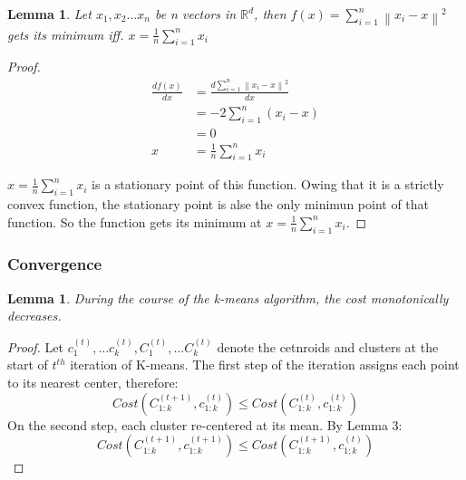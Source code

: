 \documentclass[11pt]{article}
\newtheorem{lemma}[theorem]{Lemma}
\begin{document}
\begin{lemma}
  Let $x_1, x_2 \dots x_n$ be n vectors in $\mathbb{R}^{d}$, then $f(x) = \sum_{i=1}^{n} {\left\lVert x_i - x\right\rVert}^2 $ gets its minimum iff. $x = \frac{1}{n} \sum_{i=1}^{n}x_i$
\end{lemma}
\begin{proof}
  \begin{equation*}
    \begin{split}
      \frac{d f(x)}{d x} &=  \frac{d \sum_{i=1}^{n} {\left\lVert x_i - x\right\rVert}^2}{d x} \\
      & = -2\sum_{i=1}^{n} (x_i - x) \\
      & = 0 \\
      x & = \frac{1}{n} \sum_{i=1}^{n}x_i
    \end{split}
  \end{equation*}
  
  \par $x = \frac{1}{n} \sum_{i=1}^{n}x_i$ is a stationary point of this function. Owing that it is a strictly convex function, the stationary point is alse the only minimun point of that function. 
  So the function gets its minimum at $x = \frac{1}{n} \sum_{i=1}^{n}x_i$.
  \end{proof}
  \subsubsection{Convergence}
  \begin{lemma}
    During the course of the k-means algorithm, the cost monotonically decreases.
  \par 
  \end{lemma}
  \begin{proof}
    Let $c_1^{(t)}, \dots c_k^{(t)}, C_1^{(t)}, \dots C_k^{(t)}$ denote the cetnroids and clusters at the start of $t^{th}$ iteration of K-means.
    The first step of the iteration assigns each point to its nearest center, therefore:
    $$Cost(C_{1:k}^{(t+1)}, c_{1:k}^{(t)}) \leq Cost(C_{1:k}^{(t)}, c_{1:k}^{(t)})$$
    On the second step, each cluster re-centered at its mean. By Lemma 3:
    $$Cost(C_{1:k}^{(t+1)}, c_{1:k}^{(t+1)}) \leq Cost(C_{1:k}^{(t+1)}, c_{1:k}^{(t)})$$
  \end{proof}
\end{document}
